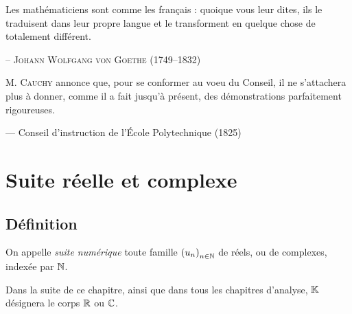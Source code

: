 \documentclass{magnolia}
\begin{document}
\setlength{}
\epigraph{\og Les mathématiciens sont comme les français : quoique vous leur dites, ils le traduisent dans leur propre langue et le transforment en quelque chose de totalement différent.\fg}{-- \textsc{Johann Wolfgang von Goethe (1749--1832)}}
\setlength{}
\epigraph{\og M. \textsc{Cauchy} annonce que, pour se conformer au voeu du Conseil, il ne s'attachera plus à donner, comme il a fait jusqu'à présent, des démonstrations parfaitement rigoureuses.\fg}{--- Conseil d'instruction de l'École Polytechnique (1825)}

\magtoc



\section{Suite réelle et complexe}
\subsection{Définition}

\begin{definition}[utile=-3]
On appelle \emph{suite numérique} toute famille $\left(u_n\right)_{n\in\mathbb{N}}$ de réels,
ou de complexes, indexée par $\mathbb{N}$.
\end{definition}

\begin{remarqueUnique}
\remarque Dans la suite de ce chapitre, ainsi que dans tous les chapitres d'analyse,
  $\mathbb{K}$ désignera le corps $\mathbb{R}$ ou $\mathbb{C}$.
\end{remarqueUnique}


\end{document}
